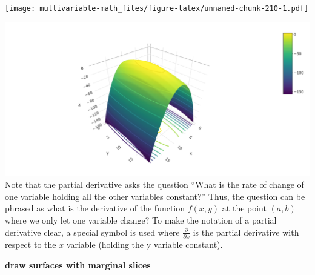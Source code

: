 \documentclass[
]{book}
\newenvironment{Shaded}{\begin{snugshade}}{\end{snugshade}}
\newcommand{\DataTypeTok}[1]{\textcolor[rgb]{0.13,0.29,0.53}{#1}}
\newcommand{\DecValTok}[1]{\textcolor[rgb]{0.00,0.00,0.81}{#1}}
\newcommand{\KeywordTok}[1]{\textcolor[rgb]{0.13,0.29,0.53}{\textbf{#1}}}
\newcommand{\NormalTok}[1]{#1}
\newcommand{\OperatorTok}[1]{\textcolor[rgb]{0.81,0.36,0.00}{\textbf{#1}}}
\newcommand{\OtherTok}[1]{\textcolor[rgb]{0.56,0.35,0.01}{#1}}
\newcommand{\StringTok}[1]{\textcolor[rgb]{0.31,0.60,0.02}{#1}}
\theoremstyle{definition}
\theoremstyle{definition}
\theoremstyle{definition}
\theoremstyle{definition}
\theoremstyle{remark}
\begin{document}
\texttt{[image: multivariable-math\_files/figure-latex/unnamed-chunk-210-1.pdf]}

\begin{Shaded}
\end{Shaded}

\includegraphics[width=1\linewidth]{./webshot-images/contour}
Note that the partial derivative asks the question ``What is the rate of change of one variable holding all the other variables constant?'' Thus, the question can be phrased as what is the derivative of the function \(f(x, y)\) at the point \((a, b)\) where we only let one variable change? To make the notation of a partial derivative clear, a special symbol is used where \(\frac{\partial}{\partial x}\) is the partial derivative with respect to the \(x\) variable (holding the y variable constant).

\textbf{draw surfaces with marginal slices}
\end{document}

